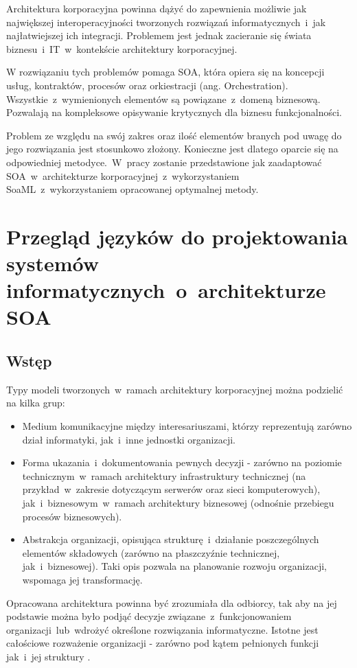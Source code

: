 Architektura korporacyjna powinna dążyć do zapewnienia możliwie jak największej interoperacyjności tworzonych rozwiązań informatycznych~i~jak najłatwiejszej ich integracji. Problemem jest jednak zacieranie się świata biznesu~i~IT~w~kontekście architektury korporacyjnej.

W rozwiązaniu tych problemów pomaga SOA, która opiera się na koncepcji usług, kontraktów, procesów oraz orkiestracji (ang. Orchestration). Wszystkie~z~wymienionych elementów są powiązane~z~domeną biznesową. Pozwalają na kompleksowe opisywanie krytycznych dla biznesu funkcjonalności. 

Problem ze względu na swój zakres oraz ilość elementów branych pod uwagę do jego rozwiązania jest stosunkowo złożony. Konieczne jest dlatego oparcie się na odpowiedniej metodyce.~W~pracy zostanie przedstawione jak zaadaptować SOA~w~architekturze korporacyjnej~z~wykorzystaniem SoaML~z~wykorzystaniem opracowanej optymalnej metody.

\chapter{Przegląd języków do projektowania systemów informatycznych~o~architekturze SOA}

\section{Wstęp}
Typy modeli tworzonych~w~ramach architektury korporacyjnej można podzielić na kilka grup:
\begin{itemize}
\item{Medium komunikacyjne między interesariuszami, którzy reprezentują zarówno dział informatyki, jak~i~inne jednostki organizacji.}
\item{Forma ukazania~i~dokumentowania pewnych decyzji - zarówno na poziomie technicznym~w~ramach architektury infrastruktury technicznej (na przykład~w~zakresie dotyczącym serwerów oraz sieci komputerowych), jak~i~biznesowym~w~ramach architektury biznesowej (odnośnie przebiegu procesów biznesowych).}
\item{Abstrakcja organizacji, opisująca strukturę~i~działanie poszczególnych elementów składowych (zarówno na płaszczyźnie technicznej, jak~i~biznesowej). Taki opis pozwala na planowanie rozwoju organizacji, wspomaga jej transformację.}
\end{itemize}

Opracowana architektura powinna być zrozumiała dla odbiorcy, tak aby na jej podstawie można było podjąć decyzje związane~z~funkcjonowaniem organizacji~lub~wdrożyć określone rozwiązania informatyczne. Istotne jest całościowe rozważenie organizacji - zarówno pod kątem pełnionych funkcji jak~i~jej struktury \cite{ArchKorpSob}.

